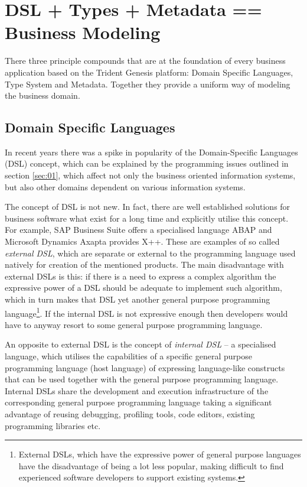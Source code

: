 \section{DSL + Types + Metadata == Business Modeling}\label{sec:03}

  There three principle compounds that are at the foundation of every business application based on the Trident Genesis platform: Domain Specific Languages, Type System and Metadata.
  Together they provide a uniform way of modeling the business domain.

\subsection{Domain Specific Languages}

  In recent years there was a spike in popularity of the Domain-Specific Languages (DSL) concept, which can be explained by the programming issues outlined in section \ref{sec:01}, which affect not only the business oriented information systems, but also other domains dependent on various information systems.

  The concept of DSL is not new.
  In fact, there are well established solutions for business software what exist for a long time and explicitly utilise this concept.
  For example, SAP Business Suite offers a specialised language ABAP and Microsoft Dynamics Axapta provides X++.
  These are examples of so called \emph{external DSL}, which are separate or external to the programming language used natively for creation of the mentioned products.
  The main disadvantage with external DSLs is this: if there is a need to express a complex algorithm the expressive power of a DSL should be adequate to implement such algorithm, which in turn makes that DSL yet another general purpose programming language\footnote{External DSLs, which have the expressive power of general purpose languages have the disadvantage of being a lot less popular, making difficult to find experienced software developers to support existing systems.}.
  If the internal DSL is not expressive enough then developers would have to anyway resort to some general purpose programming language.

  An opposite to external DSL is the concept of \emph{internal DSL} -- a specialised language, which utilises the capabilities of a specific general purpose programming language (host language) of expressing language-like constructs that can be used together with the general purpose programming language.
  Internal DSLs share the development and execution infrastructure of the corresponding general purpose programming language taking a significant advantage of reusing debugging, profiling tools, code editors, existing programming libraries etc.


